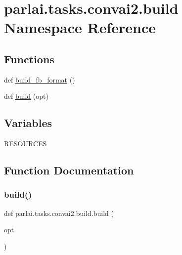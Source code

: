 \hypertarget{namespaceparlai_1_1tasks_1_1convai2_1_1build}{}\section{parlai.\+tasks.\+convai2.\+build Namespace Reference}
\label{namespaceparlai_1_1tasks_1_1convai2_1_1build}
\subsection*{Functions}
\begin{DoxyCompactItemize}
\item 
def \hyperlink{namespaceparlai_1_1tasks_1_1convai2_1_1build_aac893ef8d5159621bc7086097270f7c1}{build\+\_\+fb\+\_\+format} ()
\item 
def \hyperlink{namespaceparlai_1_1tasks_1_1convai2_1_1build_a2faeed65bdc0f4793f8a1f8cb840ec74}{build} (opt)
\end{DoxyCompactItemize}
\subsection*{Variables}
\begin{DoxyCompactItemize}
\item 
\hyperlink{namespaceparlai_1_1tasks_1_1convai2_1_1build_afdbb11b38c4377e0d759ccb0aaed5495}{R\+E\+S\+O\+U\+R\+C\+ES}
\end{DoxyCompactItemize}


\subsection{Function Documentation}
\mbox{\label{namespaceparlai_1_1tasks_1_1convai2_1_1build_a2faeed65bdc0f4793f8a1f8cb840ec74}} 
\subsubsection{\texorpdfstring{build()}{build()}}
{\footnotesize\ttfamily def parlai.\+tasks.\+convai2.\+build.\+build (\begin{DoxyParamCaption}\item[{}]{opt }\end{DoxyParamCaption})}



